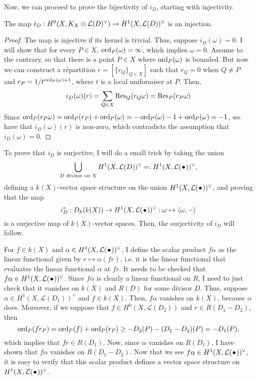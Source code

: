 Now, we can proceed to prove the bijectivity of $i_{D}$, starting with
injectivity.
\begin{prop}\label{prop:injectivity}
  The map $i_{D}:H^0(X,K_X\otimes\mathcal{L}(D)^{\vee})\to H^{1}(X,\mathcal{L}(D))^{\vee}$ is an injection.
\end{prop}
\begin{proof}
  The map is injective if its kernel is trivial. Thus, suppose
  $i_{D}(\omega)=0$. I will show that for every $P\in X$,
  $\operatorname{ord}_{P}(\omega)=\infty$, which implies $\omega=0$.
  Assume to the contrary, so that there is a point $P\in X$ where
  $\operatorname{ord}_{P}(\omega)$ is bounded. But now we can construct a r\'epartition
  $r=[\{r_{Q}\}_{Q\in X}]$ such that $r_{Q}=0$ when $Q\neq P$ and
  $r_{P}=1/t^{\operatorname{ord}_{P}(\omega)+1}$, where $t$ is a local uniformiser at $P$.
  Then,
  \[
    i_{D}(\omega)(r)=\sum_{Q\in X}\operatorname{Res}_{Q}(r_{Q}\omega)=\operatorname{Res}_{P}(r_{P}\omega)
  \]
  Since $\operatorname{ord}_{P}(r_{P}\omega)=\operatorname{ord}_{P}(r_{P})+\operatorname{ord}_{P}(\omega)
  =-\operatorname{ord}_{P}(\omega)-1+\operatorname{ord}_{P}(\omega)=-1$, we have that $i_{D}(\omega)(r)$ is
  non-zero, which contradicts the assumption that $i_{D}(\omega)=0$.
\end{proof}

To prove that $i_{D}$ is surjective, I will do a small trick by taking
the union
\[
  \bigcup_{D\text{ divisor on }X}H^{1}(X,\mathcal{L}(D))^{\vee}=:H^1(X,\mathcal{L}(\kern.08em\bullet\kern.08em))^{\vee},
\]
defining a $k(X)$-vector space structure on the union $H^1(X,\mathcal{L}(\kern.08em\bullet\kern.08em))^{\vee}$,
and proving that the map
\[
  i_{D}^{\ast}:D_{k}(k(X))\to H^1(X,\mathcal{L}(\kern.08em\bullet\kern.08em))^{\vee}:\omega\mapsto \langle\omega, -\rangle
\]
is a surjective map of $k(X)$-vector spaces. Then, the surjectivity
of $i_{D}$ will follow.

For $f\in k(X)$ and $\alpha\in H^1(X,\mathcal{L}(\kern.08em\bullet\kern.08em))^{\vee}$, I define the scalar product
$f\alpha$ as the linear functional given by $r\mapsto\alpha(fr)$,
i.e. it is the linear functional that evaluates the linear
functional $\alpha$ at $fr$. It needs to be checked that $f\alpha\in H^1(X,\mathcal{L}(\kern.08em\bullet\kern.08em))^{\vee}$.
Since $f\alpha$ is clearly a linear functional on $R$, I need to just check
that it vanishes on $k(X)$ and $R(D)$ for some divisor $D$. Thus, suppose
$\alpha\in H^{1}(X,\mathcal{L}(D_{1}))^{\vee}$ and $f\in k(X)$. Then, $f\alpha$
vanishes on $k(X)$, because $\alpha$ does. Moreover, if we suppose
that $f\in H^{0}(X,\mathcal{L}(D_{2}))$ and $r\in R(D_{1}-D_{2})$, then
\[
  \operatorname{ord}_{P}(fr_{P})=\operatorname{ord}_{P}(f)+\operatorname{ord}_{P}(r_{P})\geq -D_{2}(P)-(D_{1}-D_{2})(P)
  =-D_{1}(P),
\]
which implies that $fr\in R(D_{1})$. Now, since $\alpha$ vanishes on
$R(D_{1})$, I have shown that $f\alpha$ vanishes on $R(D_{1}-D_{2})$.
Now that we see $f\alpha\in H^1(X,\mathcal{L}(\kern.08em\bullet\kern.08em))^{\vee}$, it is easy to verify that this
scalar product defines a vector space structure on $H^1(X,\mathcal{L}(\kern.08em\bullet\kern.08em))^{\vee}$.

